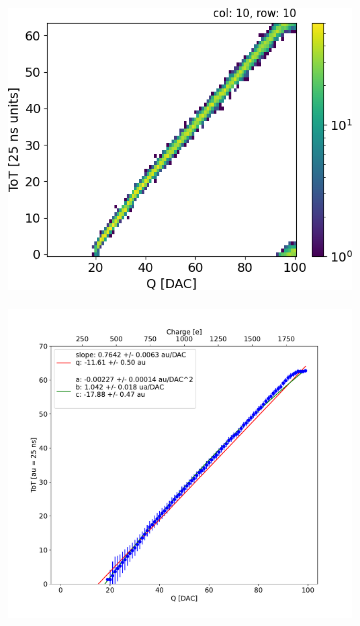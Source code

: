         \begin{figure}
            \centering
            \begin{subfigure}[b]{0.49\textwidth}
                \centering
                \includegraphics[width=\linewidth]{figures/charaterization/ToT_rollover.png}                 
                \caption{}
                \label{fig:ToT_hist2d}
            \end{subfigure}
            \hfill
            \begin{subfigure}[b]{0.49\textwidth}
                \centering
                \includegraphics[width=\linewidth]{figures/charaterization/ToT_injection.pdf}             

\end{subfigure}
\end{figure}
